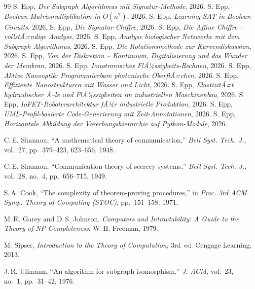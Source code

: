 ﻿\documentclass[a4paper,12pt]{scrreprt}
\theoremstyle{definition}
\begin{document}
\begingroup
\begin{thebibliography}{99}
  S. Epp, \textit{Der Subgraph Algorithmus mit Signatur-Methode}, 2026.
 S. Epp, \textit{Boolean Matrixmultiplikation in $O(n^2)$}, 2026.
 S. Epp, \textit{Learning SAT in Boolean Circuits}, 2026.
 S. Epp, \textit{Die Signatur-Chiffre}, 2026.
 S. Epp, \textit{Die Affine Chiffre -- vollstÃ¤ndige Analyse}, 2026.
 S. Epp, \textit{Analyse biologischer Netzwerke mit dem Subgraph Algorithmus}, 2026.
 S. Epp, \textit{Die Rotationsmethode zur Kurvendiskussion}, 2026.
 S. Epp, \textit{Von der Diskretion -- Kontinuum, Digitalisierung und das Wunder der Membran}, 2026.
 S. Epp, \textit{Ionotronisches FlÃ¼ssigkeits-Rechnen}, 2026.
 S. Epp, \textit{Aktive Nanooptik: Programmierbare photonische OberflÃ¤chen}, 2026.
 S. Epp, \textit{Effiziente Nanostrukturen mit Wasser und Licht}, 2026.
 S. Epp, \textit{ElastizitÃ¤t hydraulischer Ã–le und FlÃ¼ssigkeiten im industriellen Maschinenbau}, 2026.
 S. Epp, \textit{IoFET-Roboterarchitektur fÃ¼r industrielle Produktion}, 2026.
 S. Epp, \textit{UML-Profil-basierte Code-Generierung mit Zeit-Annotationen}, 2026.
 S. Epp, \textit{Horizontale Abbildung der Vererbungshierarchie auf Python-Module}, 2026.

 C.\,E. Shannon, ``A mathematical theory of communication,''
  \textit{Bell Syst. Tech. J.}, vol.~27, pp.~379--423, 623--656, 1948.

 C.\,E. Shannon, ``Communication theory of secrecy systems,''
  \textit{Bell Syst. Tech. J.}, vol.~28, no.~4, pp.~656--715, 1949.

 S.\,A. Cook, ``The complexity of theorem-proving procedures,''
  in \textit{Proc. 3rd ACM Symp. Theory of Computing (STOC)}, pp.~151--158, 1971.

 M.\,R. Garey and D.\,S. Johnson,
  \textit{Computers and Intractability: A Guide to the Theory of NP-Completeness}.
  W.\,H. Freeman, 1979.

 M. Sipser,
  \textit{Introduction to the Theory of Computation}, 3rd~ed.
  Cengage Learning, 2013.

 J.\,R. Ullmann, ``An algorithm for subgraph isomorphism,''
  \textit{J. ACM}, vol.~23, no.~1, pp.~31--42, 1976.


\end{thebibliography}
\end{document}
